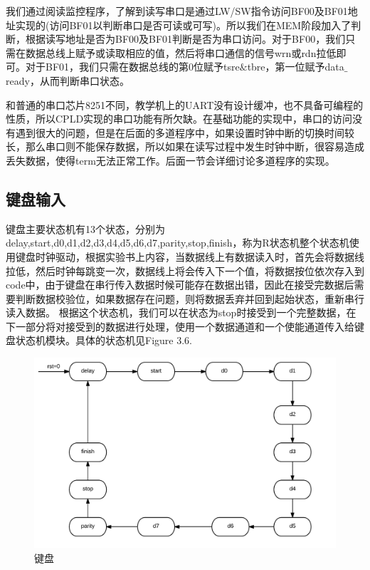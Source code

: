 我们通过阅读监控程序，了解到读写串口是通过LW/SW指令访问BF00及BF01地址实现的(访问BF01以判断串口是否可读或可写)。所以我们在MEM阶段加入了判断，根据读写地址是否为BF00及BF01判断是否为串口访问。对于BF00，我们只需在数据总线上赋予或读取相应的值，然后将串口通信的信号wrn或rdn拉低即可。对于BF01，我们只需在数据总线的第0位赋予tsre$\&$tbre，第一位赋予data$\_$ready，从而判断串口状态。

和普通的串口芯片8251不同，教学机上的UART没有设计缓冲，也不具备可编程的性质，所以CPLD实现的串口功能有所欠缺。在基础功能的实现中，串口的访问没有遇到很大的问题，但是在后面的多道程序中，如果设置时钟中断的切换时间较长，那么串口则不能保存数据，所以如果在读写过程中发生时钟中断，很容易造成丢失数据，使得term无法正常工作。后面一节会详细讨论多道程序的实现。

\subsection{键盘输入}

键盘主要状态机有13个状态，分别为delay,start,d0,d1,d2,d3,d4,d5,d6,d7,parity,stop,finish，称为R状态机整个状态机使用键盘时钟驱动，根据实验书上内容，当数据线上有数据读入时，首先会将数据线拉低，然后时钟每跳变一次，数据线上将会传入下一个值，将数据按位依次存入到code中，由于键盘在串行传入数据时候可能存在数据出错，因此在接受完数据后需要判断数据校验位，如果数据存在问题，则将数据丢弃并回到起始状态，重新串行读入数据。
	根据这个状态机，我们可以在状态为stop时接受到一个完整数据，在下一部分将对接受到的数据进行处理，使用一个数据通道和一个使能通道传入给键盘状态机模块。具体的状态机见Figure 3.6.
\begin{figure}[H]
  \includegraphics[width=\linewidth]{Figures/keyboard_main.png}
  \caption{键盘}
\end{figure}

